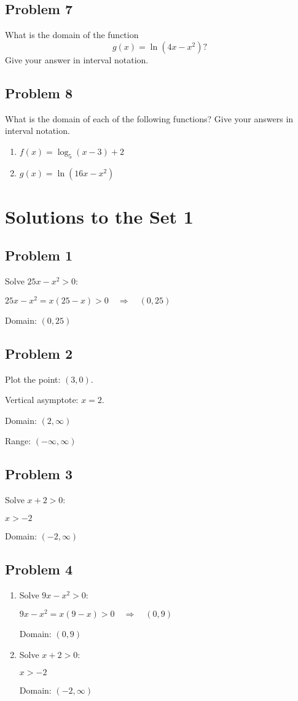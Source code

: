 \documentclass[12pt]{article}
\begin{document}
\subsection*{Problem 7}
What is the domain of the function
\[
g(x) = \ln(4x - x^2)?
\]
Give your answer in interval notation.

\subsection*{Problem 8}
What is the domain of each of the following functions? Give your answers in interval notation.
\begin{enumerate}[label=(\alph*)]
  \item \( f(x) = \log_{5}(x - 3) + 2 \)
  \item \( g(x) = \ln(16x - x^2) \)
\end{enumerate}

\newpage
\section*{Solutions to the Set 1}

\subsection*{Problem 1}
Solve \(25x - x^2 > 0\):

\noindent\(25x - x^2 = x(25 - x) > 0 \quad\Rightarrow\quad (0,25)\)

\noindent Domain: \(\boxed{(0,25)}\)

\subsection*{Problem 2}
Plot the point: \((3,0)\).  

\noindent Vertical asymptote: \(x=2\).  

\noindent Domain: \(\boxed{(2,\infty)}\)  

\noindent Range: \(\boxed{(-\infty,\infty)}\)

\subsection*{Problem 3}
Solve \(x + 2 > 0\):

\noindent\(x > -2\)

\noindent Domain: \(\boxed{(-2,\infty)}\)

\subsection*{Problem 4}
\begin{enumerate}[label=(\alph*)]
  \item Solve \(9x - x^2 > 0\):

\noindent\(9x - x^2 = x(9 - x) > 0 \quad\Rightarrow\quad (0,9)\)

\noindent Domain: \(\boxed{(0,9)}\)

  \item Solve \(x + 2 > 0\):

\noindent\(x > -2\)

\noindent Domain: \(\boxed{(-2,\infty)}\)
\end{enumerate}
\end{document}
